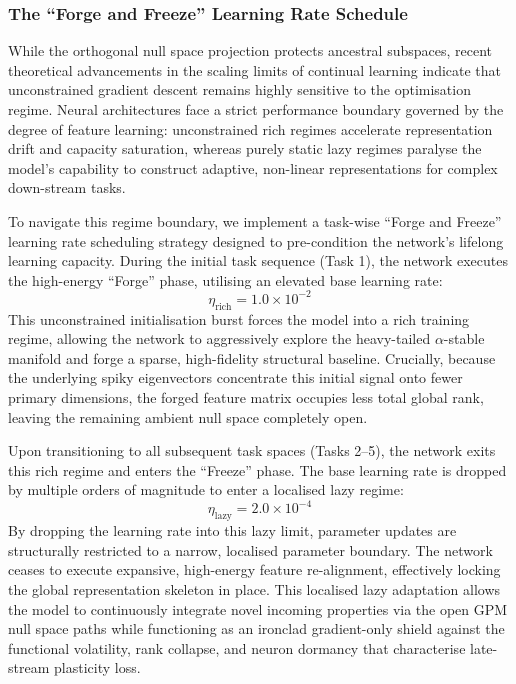 \documentclass[10pt,a4paper]{article}
\begin{document}
	\subsubsection{The ``Forge and Freeze'' Learning Rate Schedule}
	While the orthogonal null space projection protects ancestral subspaces, recent theoretical advancements in the scaling limits of continual learning indicate that unconstrained gradient descent remains highly sensitive to the optimisation regime. Neural architectures face a strict performance boundary governed by the degree of feature learning: unconstrained rich regimes accelerate representation drift and capacity saturation, whereas purely static lazy regimes paralyse the model's capability to construct adaptive, non-linear representations for complex down-stream tasks. 
	
	To navigate this regime boundary, we implement a task-wise ``Forge and Freeze'' learning rate scheduling strategy designed to pre-condition the network's lifelong learning capacity. During the initial task sequence (Task 1), the network executes the high-energy ``Forge'' phase, utilising an elevated base learning rate:
	\begin{equation}
		\eta_{\text{rich}} = 1.0 \times 10^{-2}
	\end{equation}
	This unconstrained initialisation burst forces the model into a rich training regime, allowing the network to aggressively explore the heavy-tailed $\alpha$-stable manifold and forge a sparse, high-fidelity structural baseline. Crucially, because the underlying spiky eigenvectors concentrate this initial signal onto fewer primary dimensions, the forged feature matrix occupies less total global rank, leaving the remaining ambient null space completely open.
	
	Upon transitioning to all subsequent task spaces (Tasks 2--5), the network exits this rich regime and enters the ``Freeze'' phase. The base learning rate is dropped by multiple orders of magnitude to enter a localised lazy regime:
	\begin{equation}
		\eta_{\text{lazy}} = 2.0 \times 10^{-4}
	\end{equation}
	By dropping the learning rate into this lazy limit, parameter updates are structurally restricted to a narrow, localised parameter boundary. The network ceases to execute expansive, high-energy feature re-alignment, effectively locking the global representation skeleton in place. This localised lazy adaptation allows the model to continuously integrate novel incoming properties via the open GPM null space paths while functioning as an ironclad gradient-only shield against the functional volatility, rank collapse, and neuron dormancy that characterise late-stream plasticity loss.
\end{document}
